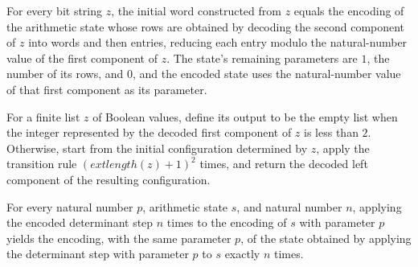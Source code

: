 \begin{theorem}
\label{Complexity.BinArith.initW_eq}
\leanok
{}
For every bit string $z$, the initial word constructed from $z$ equals the encoding of
the arithmetic state whose rows are obtained by decoding the second component of $z$
into words and then entries, reducing each entry modulo the natural-number value of the
first component of $z$. The state’s remaining parameters are $1$, the number of its
rows, and $0$, and the encoded state uses the natural-number value of that first
component as its parameter.
\end{theorem}

\begin{definition}
\label{Complexity.BinArith.detModAlg}
\leanok
{}
For a finite list $z$ of Boolean values, define its output to be the empty list when the
integer represented by the decoded first component of $z$ is less than $2$. Otherwise,
start from the initial configuration determined by $z$, apply the transition rule
$(	ext{length}(z)+1)^2$ times, and return the decoded left component of the resulting
configuration.
\end{definition}

\begin{theorem}
\label{Complexity.BinArith.iterate_detWStep_encState}
\leanok
{}
For every natural number $p$, arithmetic state $s$, and natural number $n$, applying the
encoded determinant step $n$ times to the encoding of $s$ with parameter $p$ yields the
encoding, with the same parameter $p$, of the state obtained by applying the determinant
step with parameter $p$ to $s$ exactly $n$ times.
\end{theorem}

